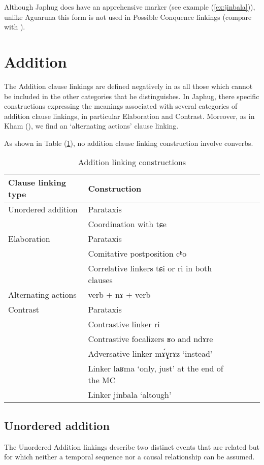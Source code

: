 \documentclass[oldfontcommands,oneside,a4paper,11pt]{article}
\newcommand{\ipa}[1]{{\phon \mbox{#1}}} %
\newcommand{\refb}[1]{(\ref{#1})}
\begin{document}
Although Japhug does have an apprehensive marker (see example \refb{ex:jinbala}), unlike Aguaruna this form is not used in Possible Conquence linkings  (compare with \citealt[187]{overall09linking}). 


\section{Addition}
The Addition clause linkings are defined negatively in \citet[26]{dixon09intro} as all those which cannot be included in the other categories that he distinguishes. In Japhug,    there   specific constructions   expressing the meanings associated with several categories of addition clause linkings, in particular Elaboration and Contrast. Moreover, as in Kham (\citealt[113]{watters09kham}), we find an `alternating actions' clause linking.

As shown in Table \refb{tab:addition}, no addition clause linking construction involve converbs.

\begin{table}[h]
\caption{Addition linking constructions} \label{tab:addition}
\begin{tabular}{lllll}
\toprule
 Clause linking type &Construction \\
\midrule
Unordered addition &Parataxis   \\
  &Coordination with \ipa{tɕe}    \\
\midrule
Elaboration &Parataxis   \\
  &Comitative postposition \ipa{cʰo}     \\
    &Correlative linkers \ipa{tɕi} or \ipa{ri} in both clauses    \\
\midrule
Alternating actions & verb + \ipa{nɤ} + verb \\
\midrule
Contrast &Parataxis   \\
&Contrastive linker \ipa{ri}   \\
&Contrastive focalizers \ipa{ʁo}  and \ipa{ndɤre}  \\
&Adversative linker \ipa{mɤ́ɣrɤz} `instead' \\
&Linker \ipa{laʁma} `only, just' at the end of  the MC \\
&Linker \ipa{jinbala} `altough'   \\
\bottomrule
\end{tabular}
\end{table}


\subsection{Unordered addition} \label{sec:unordered}
The Unordered Addition linkings describe  two distinct events that are related but for which neither a temporal sequence nor a causal relationship can be assumed. 
\end{document}
